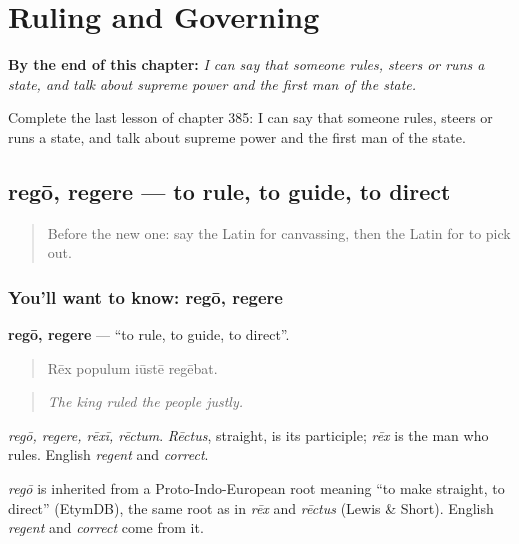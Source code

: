 
\chapter{Ruling and Governing}
\label{ch:la-ruling-and-governing}

\begin{chapteropening}
\textbf{By the end of this chapter:} \emph{I can say that someone rules, steers or runs a state, and talk about supreme power and the first man of the state.}

Complete the last lesson of chapter 385: I can say that someone rules, steers or runs a state, and talk about supreme power and the first man of the state.
\end{chapteropening}

\section[regō, regere]{regō, regere — to rule, to guide, to direct}

\label{lesson:LA-C385-rego}



\begin{quote}
Before the new one: say the Latin for canvassing, then the Latin for to pick out.
\end{quote}

\subsection*{You'll want to know: regō, regere}
\textbf{regō, regere} — \textquotedblleft{}to rule, to guide, to direct\textquotedblright{}.

\begin{quote}
Rēx populum iūstē regēbat.
\end{quote}

\begin{quote}
\emph{The king ruled the people justly.}
\end{quote}

\emph{regō, regere, rēxī, rēctum}. \emph{Rēctus}, straight, is its participle; \emph{rēx} is the man who rules. English \emph{regent} and \emph{correct}.

\begin{cousinweb}
\emph{regō} is inherited from a Proto-Indo-European root meaning \textquotedblleft{}to make straight, to direct\textquotedblright{} (EtymDB), the same root as in \emph{rēx} and \emph{rēctus} (Lewis \& Short). English \emph{regent} and \emph{correct} come from it.
\end{cousinweb}

